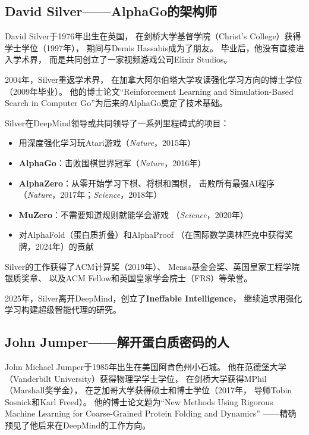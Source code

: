 \bigskip

\subsection{David Silver——AlphaGo的架构师}
\label{sec:david-silver}

David Silver于1976年出生在英国，
在剑桥大学基督学院（Christ's College）获得学士学位（1997年），
期间与Demis Hassabis成为了朋友。
毕业后，他没有直接进入学术界，
而是共同创立了一家视频游戏公司Elixir Studios。

2004年，Silver重返学术界，
在加拿大阿尔伯塔大学攻读强化学习方向的博士学位（2009年毕业）。
他的博士论文``Reinforcement Learning and Simulation-Based
Search in Computer Go''为后来的AlphaGo奠定了技术基础。

Silver在DeepMind领导或共同领导了一系列里程碑式的项目：
\begin{itemize}[noitemsep]
  \item 用深度强化学习玩Atari游戏（\textit{Nature}，2015年）
  \item \textbf{AlphaGo}：击败围棋世界冠军（\textit{Nature}，2016年）
  \item \textbf{AlphaZero}：从零开始学习下棋、将棋和围棋，
    击败所有最强AI程序（\textit{Nature}，2017年；\textit{Science}，2018年）
  \item \textbf{MuZero}：不需要知道规则就能学会游戏
    （\textit{Science}，2020年）
  \item 对AlphaFold（蛋白质折叠）和AlphaProof
    （在国际数学奥林匹克中获得奖牌，2024年）的贡献
\end{itemize}

Silver的工作获得了ACM计算奖（2019年）、
Mensa基金会奖、英国皇家工程学院银质奖章、
以及ACM Fellow和英国皇家学会院士（FRS）等荣誉。

2025年，Silver离开DeepMind，创立了\textbf{Ineffable Intelligence}，
继续追求用强化学习构建超级智能代理的研究。

\bigskip

\subsection{John Jumper——解开蛋白质密码的人}
\label{sec:jumper}

John Michael Jumper于1985年出生在美国阿肯色州小石城。
他在范德堡大学（Vanderbilt University）获得物理学学士学位，
在剑桥大学获得MPhil（Marshall奖学金），
在芝加哥大学获得硕士和博士学位（2017年，
导师Tobin Sosnick和Karl Freed）。
他的博士论文题为``New Methods Using Rigorous Machine Learning
for Coarse-Grained Protein Folding and Dynamics''
——精确预见了他后来在DeepMind的工作方向。


